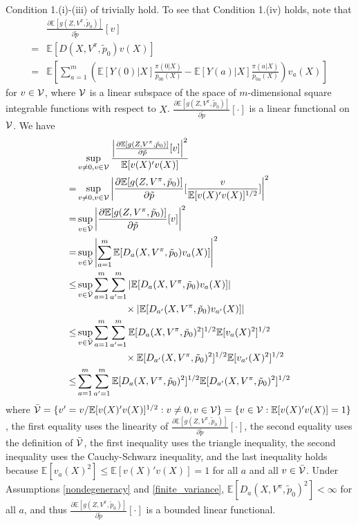 \documentclass[letterpaper]{article} \usepackage{aaai19}  \usepackage{times}  \usepackage{helvet}  \usepackage{courier}  \usepackage{url}  \usepackage{graphicx}  \frenchspacing  \usepackage{comment}
\newcommand{\citet}[1]
{\citeauthor{#1} \shortcite{#1}}
\begin{document}
Condition 1.(i)-(iii) of \citet{Ackerberg2014} trivially hold.
To see that Condition 1.(iv) holds, note that
\begin{align*}
	&\frac{\partial \mathbb{E}[g(Z,V^{\pi},\tilde p_0)]}{\partial \tilde p}[v]\\
	=&\mathbb{E}[D(X,V^{\pi},\tilde p_0)v(X)]\\
	=&\mathbb{E}[\sum_{a=1}^m(\mathbb{E}[Y(0)|X]\frac{\pi(0|X)}{p_{00}(X)}-\mathbb{E}[Y(a)|X]\frac{\pi(a|X)}{p_{0a}(X)})v_a(X)]
\end{align*}
for $v\in {\cal V}$, where ${\cal V}$ is a linear subspace of the space of $m$-dimensional square integrable functions with respect to $X$.
$\frac{\partial \mathbb{E}[g(Z,V^{\pi},\tilde p_0)]}{\partial \tilde p}[\cdot]$ is a linear functional on ${\cal V}$.
We have
\begin{align*}
	&\sup_{v\neq 0, v\in {\cal V}}\frac{\left|\frac{\partial \mathbb{E}[g(Z,V^{\pi},\tilde p_0)]}{\partial \tilde p}[v]\right|^2}{\mathbb{E}[v(X)'v(X)]}\\
	=&\sup_{v\neq 0, v\in {\cal V}}\left|\frac{\partial \mathbb{E}[g(Z,V^{\pi},\tilde p_0)]}{\partial \tilde p}[\frac{v}{\mathbb{E}[v(X)'v(X)]^{1/2}}]\right|^2\\
	=&\sup_{v\in \bar{{\cal V}}}\left|\frac{\partial \mathbb{E}[g(Z,V^{\pi},\tilde p_0)]}{\partial \tilde p}[v]\right|^2\\
	=&\sup_{v\in \bar{{\cal V}}}\left|\sum_{a=1}^m\mathbb{E}[D_a(X,V^\pi,\tilde p_0)v_a(X)]\right|^2\\
	\le&\sup_{v\in \bar{{\cal V}}}\sum_{a=1}^m\sum_{a'=1}^m|\mathbb{E}[D_a(X,V^\pi,\tilde p_0)v_a(X)]|\\
	&\hspace{5em}\times|\mathbb{E}[D_{a'}(X,V^\pi,\tilde p_0)v_{a'}(X)]|\\
	\le&\sup_{v\in \bar{{\cal V}}}\sum_{a=1}^m\sum_{a'=1}^m\mathbb{E}[D_a(X,V^\pi,\tilde p_0)^2]^{1/2}\mathbb{E}[v_a(X)^2]^{1/2}\\
	&\hspace{5em}\times \mathbb{E}[D_{a'}(X,V^\pi,\tilde p_0)^2]^{1/2}\mathbb{E}[v_{a'}(X)^2]^{1/2}\\
	\le&\sum_{a=1}^m\sum_{a'=1}^m\mathbb{E}[D_a(X,V^\pi,\tilde p_0)^2]^{1/2}\mathbb{E}[D_{a'}(X,V^\pi,\tilde p_0)^2]^{1/2}
\end{align*}
where $\bar{{\cal V}}=\{v'=v/\mathbb{E}[v(X)'v(X)]^{1/2}: v\neq 0, v\in {\cal V}\}=\{v\in {\cal V}: \mathbb{E}[v(X)'v(X)]=1\}$, the first equality uses the linearity of $\frac{\partial \mathbb{E}[g(Z,V^{\pi},\tilde p_0)]}{\partial \tilde p}[\cdot]$, the second equality uses the definition of $\bar{{\cal V}}$, the first inequality uses the triangle inequality, the second inequality uses the Cauchy-Schwarz inequality, and the last inequality holds because $\mathbb{E}[v_a(X)^2]\le \mathbb{E}[v(X)'v(X)]=1$ for all $a$ and all $v\in \bar{{\cal V}}$.
Under Assumptions \ref{nondegeneracy} and \ref{finite_variance}, $\mathbb{E}[D_a(X,V^\pi,\tilde p_0)^2]<\infty$ for all $a$, and thus $\frac{\partial \mathbb{E}[g(Z,V^{\pi},\tilde p_0)]}{\partial \tilde p}[\cdot]$ is a bounded linear functional.
\end{document}
